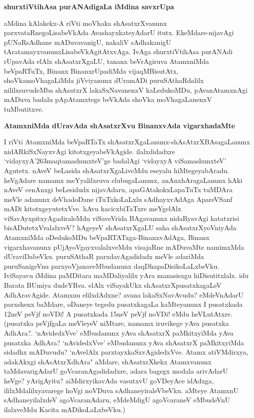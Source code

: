 {\bigskip
\noindent
{\large\bf shurxtiVtihAsa purANAdigaLa iMdina savxrUpa}}\label{page187}
\medskip

\noindent
aMdina kAlakekx-A riVti moVhaka shAsatxrXvanunx parxvataRnegoLisabeVkAda Avashayxkate\-yAdarU itutx. EkeMdare-nijavAgi pUNaRsAdhane mADuvavanigU, nakaliV sAdhakanigU tAratamayxvanunxLisabeVkAgitAtx\-vAga. IvAga shurxtiVtihAsa purANAdi rUpavAda elAlx shAsatxrXgaLU, tananx beVrAgiruva AtamxniMda beVpaR\-TuTx, Binanx BinanxrUpadiMda vijaqMBisutAtx, shoVkamoVhagaLiMda jiVviyanunx dUramADi puruSAthaR\-dalilx nililxsuvudeMba shAsatxrX lakaSxNavanenxV kaLedukoMDu, pAvanAtamxnAgi mADuva badalu pApAtamxtege beVkAda shoVka moVhagaLanenxV tuMbutitxve.

{\bigskip
\noindent
{\large\bf AtamxniMda dUravAda shAsatxrXvu BinanxvAda vigarxhadaMte}}\label{page188}
\medskip

\noindent
I riVti AtamxniMda beVpaRTaTx shAsatxrXgaLanunx-shAsAtxrXBAsagaLanunx nidARkiSxNayxvAgi kitotxge\-yabeVkAgide. ilalxdidadxre `vidayxyA\char'263maqtamashunxteV'ge badalAgi `vidayxyA viSama\-shunxteV' Agutetx. nAveV beLasida shAsatxrX\-gaLiveMdu eseyalu hiMtegeyabAradu. heVgA\-dare namamx meYyalilxruva elubugaLanunx, anAnxhAra\-gaLanunx hAki nAveV cenAnxgi beLesidudx nijavAdaru, apaGAtakokxLapaTuTx tuMDAra meVle adanunx deVha\-doDane iTuTxkoLaLxlu sAdhayxvAdAga ApareVSanf mADi kitotxgeyutetxVve. hAvu kacicx\-biTaTxre meYgelAlx viSavAyxpitxyAgadiraleMdu viSaveVrida BAgavanunx nidaRyavAgi katatxrisi bisADutetxVvalalxveV? hAgeyeV shAsatxrXgaLU saha shAsatxrXyoVniyAda AtamxniMda oDedu\-koMDu beVpaRTATxga-BinanxvAdAga, Binanx vigarxha\-vanunx pUjAyoVgayxvalalxveMdu visajaRne mADuvaMte namimxMda dUraviDabeVku. puruSAthaR parxdavAga\-didadx meVle adariMda puruSanigeVnu parxyoVjanaveMbudanunx daqDhapaDisikoLaLxbeVku. I\break viSayavu iMdi\-na paMDitara maMDaliyalilx yAra manasisxgu hiDisutitxlalx. idu Barata BUmiya dudeYRva. elAlx viSayakUkx shAsatxrXpusatxkagaLeV AdhAravAgide. Atamxnu elilxdAdxne? avana lakaSxNavAvudu? eMdeVnAdarU parxshenx baMdare, oDaneye tegedu pusatxkagaLa kaMteyanunx I pusatxkada 12neV peVjf noVDi! A pusatxkada 15neV peVjf noVDi! eMdu heVLutAtxre. (pusatxka peVjfgaLa meVleyeV niMtare, namamx iruvikege yAva pusatxka AdhAra?. `nAvidedxVve' eMbudanunx yAva shAsatxrX paMkitx\-yiMda yAva pusatxka AdhAra? `nAvi\-dedxVve' eMbudanunx yAva shAsatxrX paMkitx\-yiMda sidadhx mADuvudu? `nAvelAlx parxtayxkaSxvAgidedxVve. Atamx atiVMdirxya, adakAkxgi shAsAtxrXdhAra" aMdare, shAsatxrXkekx Atamxvanunx taMdavarigAdarU goVcaranAgadidadxre, adara bagegx modala arivAdarU heVge? yArigAyitu? aiMdirxyikavAda vasutxvU goVDeyAce idAdxga, ililxMdalilxyavarege hoVgi noVDuva sAdhaneyiraleVbeVku. aMteye AtamxnU sAdhaneyilalxdeV agoVcaranAdaru, eMdeMdigU agoVcaraneV eMbudeVnU ilalxveMdu Kacita mADikoLaLxbeVku.)

